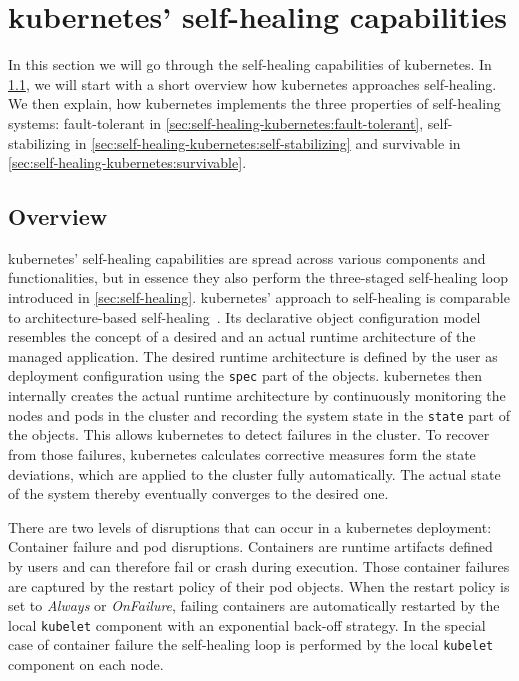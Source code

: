 
\section{\Gls{kubernetes}' self-healing capabilities}\label{sec:self-healing-kubernetes}
  In this section we will go through the self-healing capabilities of \gls{kubernetes}.
  In \cref{sec:self-healing-kubernetes:overview}, we will start with a short overview how \gls{kubernetes} approaches self-healing.
  We then explain, how \gls{kubernetes} implements the three properties of self-healing systems: fault-tolerant in \cref{sec:self-healing-kubernetes:fault-tolerant}, self-stabilizing in \cref{sec:self-healing-kubernetes:self-stabilizing} and survivable in \cref{sec:self-healing-kubernetes:survivable}.

\subsection{Overview}\label{sec:self-healing-kubernetes:overview}
  \gls{kubernetes}' self-healing capabilities are spread across various components and functionalities, but in essence they also perform the three-staged self-healing loop introduced in \cref{sec:self-healing}.
  \gls{kubernetes}' approach to self-healing is comparable to architecture-based self-healing~\cite{ToffettiMicroservices,DashofyArchitecture}.
  Its declarative object configuration model resembles the concept of a desired and an actual runtime architecture of the managed application.
  The desired runtime architecture is defined by the user as deployment configuration using the \texttt{spec} part of the objects.
  \Gls{kubernetes} then internally creates the actual runtime architecture by continuously monitoring the nodes and pods in the cluster and recording the system state in the \texttt{state} part of the objects.
  This allows \gls{kubernetes} to detect failures in the cluster.
  To recover from those failures, \gls{kubernetes} calculates corrective measures form the state deviations, which are applied to the cluster fully automatically.
  The actual state of the system thereby eventually converges to the desired one.

  There are two levels of disruptions that can occur in a \gls{kubernetes} deployment: Container failure and pod disruptions.
  Containers are runtime artifacts defined by users and can therefore fail or crash during execution.
  Those container failures are captured by the restart policy of their pod objects.
  When the restart policy is set to \textit{Always} or \textit{OnFailure}, failing containers are automatically restarted by the local \texttt{kubelet} component with an exponential back-off strategy.
  In the special case of container failure the self-healing loop is performed by the local \texttt{kubelet} component on each node.

